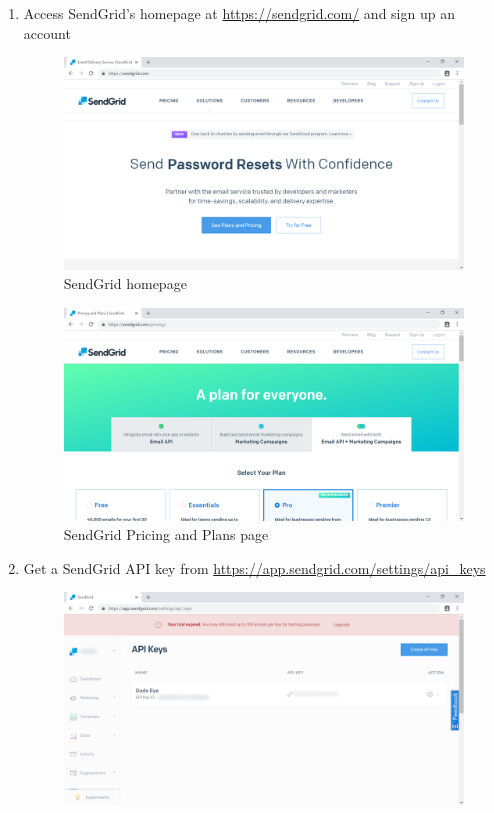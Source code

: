 \begin{enumerate}
	\item Access SendGrid’s homepage at \href{https://sendgrid.com/}{https://sendgrid.com/} and sign up an account
	      \begin{center}
	      	\begin{figure}[H]
	      		\centering
	      		\includegraphics[width=0.6\columnwidth]{images/appendixA/SendGrid-Homepage.PNG}
	      		\caption{SendGrid homepage}
	      	\end{figure}
	      \end{center}
	      \begin{center}
	      	\begin{figure}[H]
	      		\centering
	      		\includegraphics[width=0.6\columnwidth]{images/appendixA/SendGrid-Pricing.PNG}
	      		\caption{SendGrid Pricing and Plans page}
	      	\end{figure}
	      \end{center}
	\item Get a SendGrid API key from \href{https://app.sendgrid.com/settings/api_keys}{https://app.sendgrid.com/settings/api\_keys}
	      \begin{center}
	      	\begin{figure}[H]
	      		\centering
	      		\includegraphics[width=0.6\columnwidth]{images/appendixA/SendGrid-API-Keys.png}

\end{figure}
\end{center}
\end{enumerate}
